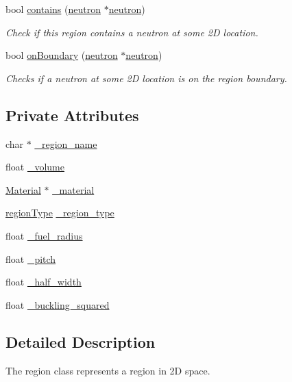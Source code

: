 \begin{DoxyCompactItemize}
bool \hyperlink{classRegion_a056e2c3e94253b54b7715d6232c6fade}{contains} (\hyperlink{structneutron}{neutron} $\ast$\hyperlink{structneutron}{neutron})
\begin{DoxyCompactList}\small\item\em Check if this region contains a neutron at some 2\-D location. \end{DoxyCompactList}\item 
bool \hyperlink{classRegion_a725dd2c9786f1b0df1a4eb66b00cc0f2}{on\-Boundary} (\hyperlink{structneutron}{neutron} $\ast$\hyperlink{structneutron}{neutron})
\begin{DoxyCompactList}\small\item\em Checks if a neutron at some 2\-D location is on the region boundary. \end{DoxyCompactList}\end{DoxyCompactItemize}
\subsection*{Private Attributes}
\begin{DoxyCompactItemize}
\item 
char $\ast$ \hyperlink{classRegion_abf94b7a06d6b1500a77b68505868d312}{\-\_\-region\-\_\-name}
\item 
float \hyperlink{classRegion_ad4345a279ed2211c94a73c4bd1f28ba8}{\-\_\-volume}
\item 
\hyperlink{classMaterial}{Material} $\ast$ \hyperlink{classRegion_afeb207eb640d2543a9b5a1bb2097c50d}{\-\_\-material}
\item 
\hyperlink{Region_8h_a2c25b4a3d851e2d45d7a435a73598323}{region\-Type} \hyperlink{classRegion_a83913828a5b45d69aa073bc567a03750}{\-\_\-region\-\_\-type}
\item 
float \hyperlink{classRegion_a344918fd4f1847efd6be99f2326eaa87}{\-\_\-fuel\-\_\-radius}
\item 
float \hyperlink{classRegion_a378e08077c7f1dd45ed10dddf767415b}{\-\_\-pitch}
\item 
float \hyperlink{classRegion_a62b5f5e778d5e95d6289d0f0948a312c}{\-\_\-half\-\_\-width}
\item 
float \hyperlink{classRegion_a2731c8000023342a08a5799e0aa5c0d2}{\-\_\-buckling\-\_\-squared}
\end{DoxyCompactItemize}


\subsection{Detailed Description}
The region class represents a region in 2\-D space. 

